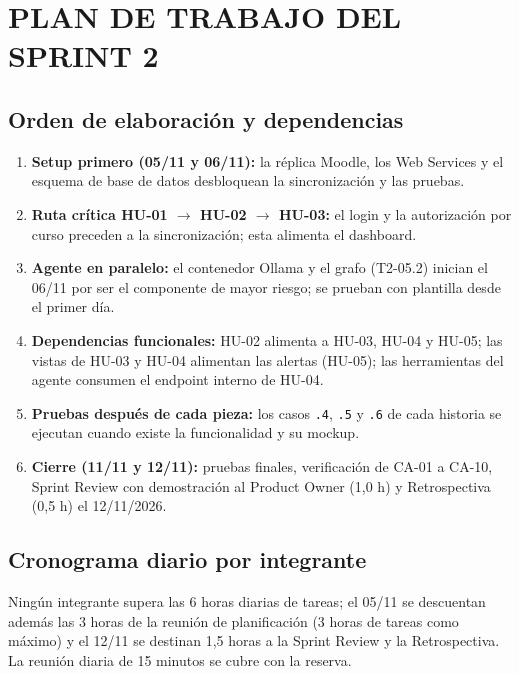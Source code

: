 \documentclass[11pt,a4paper]{article}
\begin{document}
\section{PLAN DE TRABAJO DEL SPRINT 2}

\subsection{Orden de elaboración y dependencias}
\begin{enumerate}
  \item \textbf{Setup primero (05/11 y 06/11):} la réplica Moodle, los Web Services y el esquema de base de datos desbloquean la sincronización y las pruebas.
  \item \textbf{Ruta crítica HU-01 $\rightarrow$ HU-02 $\rightarrow$ HU-03:} el login y la autorización por curso preceden a la sincronización; esta alimenta el dashboard.
  \item \textbf{Agente en paralelo:} el contenedor Ollama y el grafo (T2-05.2) inician el 06/11 por ser el componente de mayor riesgo; se prueban con plantilla desde el primer día.
  \item \textbf{Dependencias funcionales:} HU-02 alimenta a HU-03, HU-04 y HU-05; las vistas de HU-03 y HU-04 alimentan las alertas (HU-05); las herramientas del agente consumen el endpoint interno de HU-04.
  \item \textbf{Pruebas después de cada pieza:} los casos \texttt{.4}, \texttt{.5} y \texttt{.6} de cada historia se ejecutan cuando existe la funcionalidad y su mockup.
  \item \textbf{Cierre (11/11 y 12/11):} pruebas finales, verificación de CA-01 a CA-10, Sprint Review con demostración al Product Owner (1,0 h) y Retrospectiva (0,5 h) el 12/11/2026.
\end{enumerate}

\subsection{Cronograma diario por integrante}
Ningún integrante supera las 6 horas diarias de tareas; el 05/11 se descuentan además las 3 horas de la reunión de planificación (3 horas de tareas como máximo) y el 12/11 se destinan 1,5 horas a la Sprint Review y la Retrospectiva. La reunión diaria de 15 minutos se cubre con la reserva.
\end{document}
